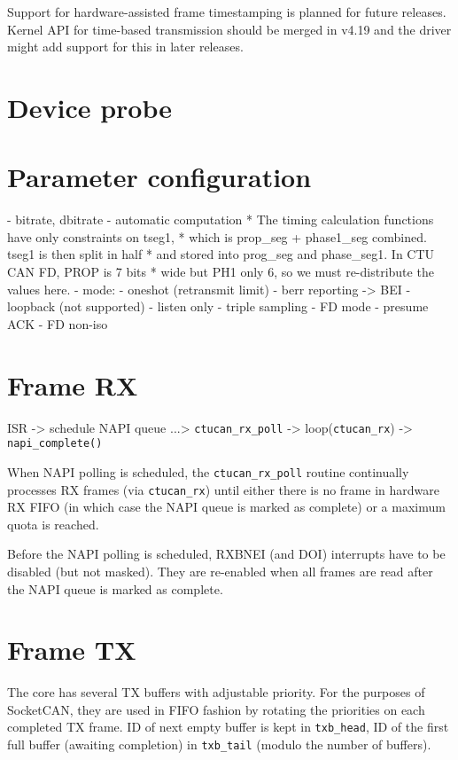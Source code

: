 Support for hardware-assisted frame timestamping is planned for future releases.
Kernel API for time-based transmission should be merged in v4.19 and the driver
might add support for this in later releases.

\section{Device probe}

\section{Parameter configuration}

- bitrate, dbitrate
    - automatic computation
        * The timing calculation functions have only constraints on tseg1,
        * which is prop\_seg + phase1\_seg combined. tseg1 is then split in half
        * and stored into prog\_seg and phase\_seg1. In CTU CAN FD, PROP is 7 bits
        * wide but PH1 only 6, so we must re-distribute the values here.
- mode:
    - oneshot (retransmit limit)
    - berr reporting -> BEI
    - loopback (not supported)
    - listen only
    - triple sampling
    - FD mode
    - presume ACK
    - FD non-iso


\section{Frame RX}

ISR -> schedule NAPI queue ...> \verb|ctucan_rx_poll| -> loop(\verb|ctucan_rx|) -> \verb|napi_complete()|

When NAPI polling is scheduled, the \verb|ctucan_rx_poll| routine continually
processes RX frames (via \verb|ctucan_rx|) until either there is no frame
in hardware RX FIFO (in which case the NAPI queue is marked as complete) or a
maximum quota is reached.

Before the NAPI polling is scheduled, RXBNEI (and DOI) interrupts have to be
disabled (but not masked). They are re-enabled when all frames are read after
the NAPI queue is marked as complete.

\section{Frame TX}

The core has several TX buffers with adjustable priority. For the purposes of
SocketCAN, they are used in FIFO fashion by rotating the priorities on each
completed TX frame. ID of next empty buffer is kept in \verb|txb_head|,
ID of the first full buffer (awaiting completion) in \verb|txb_tail| (modulo the
number of buffers).

